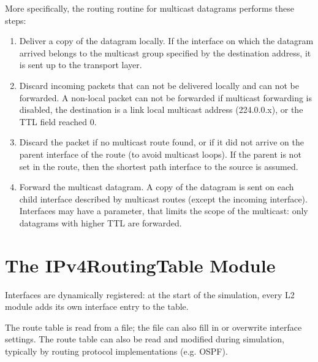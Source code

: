 More specifically, the routing routine for multicast datagrams performs these steps:
\begin{enumerate}
  \item Deliver a copy of the datagram locally. If the interface on which
  the datagram arrived belongs to the multicast group specified by the
  destination address, it is sent up to the transport layer.
  \item Discard incoming packets that can not be delivered locally and
  can not be forwarded.
  A non-local packet can not be forwarded if multicast forwarding is disabled,
  the destination is a link local multicast address (224.0.0.x), or
  the TTL field reached 0.
  \item Discard the packet if no multicast route found, or
  if it did not arrive on the parent interface of the route
  (to avoid multicast loops). If the parent is not set in the route,
  then the shortest path interface to the source is assumed.
  \item Forward the multicast datagram.
  A copy of the datagram is sent on each child interface described by
  multicast routes (except the incoming interface). Interfaces may have
  a  parameter, that limits the scope of the multicast:
  only datagrams with higher TTL are forwarded.
\end{enumerate}

\section{The IPv4RoutingTable Module}

Interfaces are dynamically registered: at the start of the simulation,
every L2 module adds its own interface entry to the table.

The route table is read from a file; the file can
also fill in or overwrite interface settings. The route table can also
be read and modified during simulation, typically by routing protocol
implementations (e.g. OSPF).

